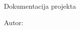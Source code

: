 \begin{titlepage}
\begin{center}

\vspace*{3.5cm}

{\large Dokumentacija projekta\par}
\vspace{0.8cm}
{\LARGE \bfseries \NaslovRada \par}

\vfill

{\large Autor: \ImeAutora\par}
\vspace{0.6cm}
{\large \MjestoGodina\par}

\end{center}
\end{titlepage}
